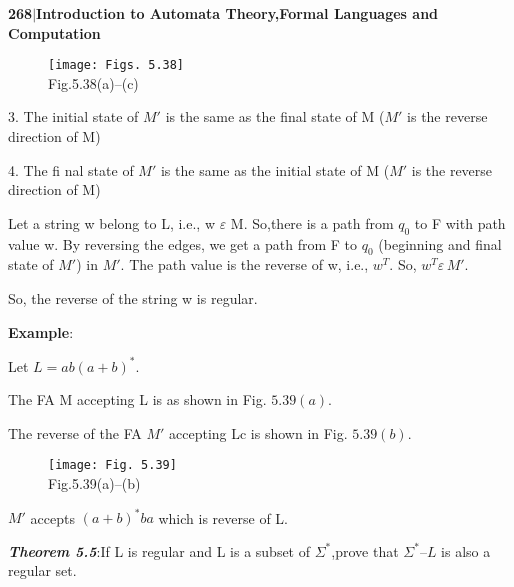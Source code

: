 \documentclass[10pt,a4paper]{article}
\begin{document}
\footnotesize

\begin{flushleft}
  \textbf{\textsf{268}$|$\textsf{Introduction to Automata Theory,Formal Languages and Computation}}
\end{flushleft}


\begin{figure}[h]
  \centering
  \texttt{[image: Figs. 5.38]}\\Fig.5.38(a)–(c)
\end{figure}



\begin{flushleft}
  3. The initial state of $M\prime$ is the same as the final state of M ($M\prime$ is the reverse direction of M)

4. The fi nal state of $M\prime$ is the same as the initial state of M ($M\prime$ is the reverse direction of M)
\end{flushleft}

\begin{flushleft}
\qquad Let a string w belong to L, i.e., w $\varepsilon$ M. So,there is a path from $q_{0}$ to F with path value w. By reversing the edges, we get a path from F to $q_{0}$ (beginning and final state of $M\prime$) in $M\prime$. The path value is the reverse of w, i.e., $w^{T}$. So, $w^{T} \varepsilon\, M\prime$.
\end{flushleft}


So, the reverse of the string w is regular.

\begin{flushleft}
  \textrm{\textbf{Example}}:

Let $L = ab(a + b)^{*}$.
\end{flushleft}

The FA M accepting L is as shown in Fig. $5.39(a)$.

The reverse of the FA $M\prime$ accepting Lc is shown in Fig. $5.39(b)$.

\begin{figure}[h]
  \centering
  \texttt{[image: Fig. 5.39]}\\ Fig.5.39(a)–(b)
\end{figure}


$M\prime$ accepts $(a + b)^{*}ba$ which is reverse of L.

\begin{flushleft}
  \emph{\textbf{Theorem 5.5}}:If L is regular and L is a subset of $\Sigma^{*}$,prove that $\Sigma^{*} – L$ is also a regular set.
\end{flushleft}
\end{document}
